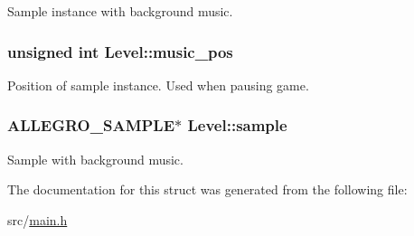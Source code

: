 \-Sample instance with background music. \hypertarget{structLevel_a13e322deb3298846260af31324e5b492}{
\subsubsection[{music\-\_\-pos}]{\setlength{\rightskip}{0pt plus 5cm}unsigned int {\bf \-Level\-::music\-\_\-pos}}}\label{structLevel_a13e322deb3298846260af31324e5b492}
\-Position of sample instance. \-Used when pausing game. \hypertarget{structLevel_a234fa7b9ec35dd360e4e3c48a944fc7d}{
\subsubsection[{sample}]{\setlength{\rightskip}{0pt plus 5cm}\-A\-L\-L\-E\-G\-R\-O\-\_\-\-S\-A\-M\-P\-L\-E$\ast$ {\bf \-Level\-::sample}}}\label{structLevel_a234fa7b9ec35dd360e4e3c48a944fc7d}
\-Sample with background music. 

\-The documentation for this struct was generated from the following file\-:\begin{DoxyCompactItemize}
\item 
src/\hyperlink{main_8h}{main.\-h}\end{DoxyCompactItemize}
